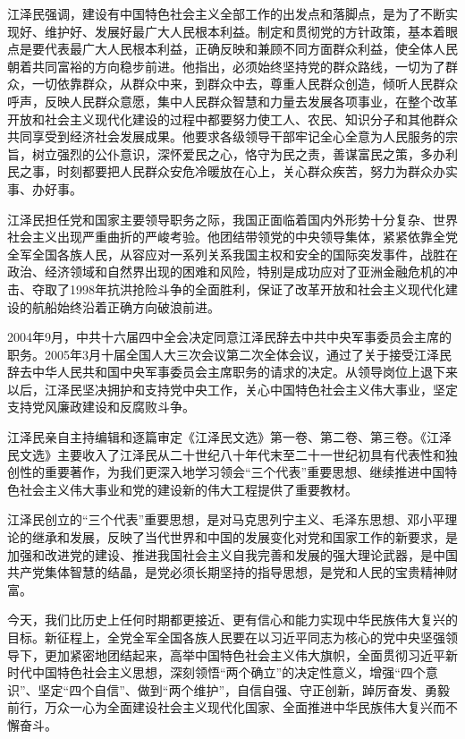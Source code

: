 \documentclass[UTF8, 11pt, oneside]{ctexart}
\begin{document}
江泽民强调，建设有中国特色社会主义全部工作的出发点和落脚点，是为了不断实现好、维护好、发展好最广大人民根本利益。制定和贯彻党的方针政策，基本着眼点是要代表最广大人民根本利益，正确反映和兼顾不同方面群众利益，使全体人民朝着共同富裕的方向稳步前进。他指出，必须始终坚持党的群众路线，一切为了群众，一切依靠群众，从群众中来，到群众中去，尊重人民群众创造，倾听人民群众呼声，反映人民群众意愿，集中人民群众智慧和力量去发展各项事业，在整个改革开放和社会主义现代化建设的过程中都要努力使工人、农民、知识分子和其他群众共同享受到经济社会发展成果。他要求各级领导干部牢记全心全意为人民服务的宗旨，树立强烈的公仆意识，深怀爱民之心，恪守为民之责，善谋富民之策，多办利民之事，时刻都要把人民群众安危冷暖放在心上，关心群众疾苦，努力为群众办实事、办好事。

江泽民担任党和国家主要领导职务之际，我国正面临着国内外形势十分复杂、世界社会主义出现严重曲折的严峻考验。他团结带领党的中央领导集体，紧紧依靠全党全军全国各族人民，从容应对一系列关系我国主权和安全的国际突发事件，战胜在政治、经济领域和自然界出现的困难和风险，特别是成功应对了亚洲金融危机的冲击、夺取了1998年抗洪抢险斗争的全面胜利，保证了改革开放和社会主义现代化建设的航船始终沿着正确方向破浪前进。

2004年9月，中共十六届四中全会决定同意江泽民辞去中共中央军事委员会主席的职务。2005年3月十届全国人大三次会议第二次全体会议，通过了关于接受江泽民辞去中华人民共和国中央军事委员会主席职务的请求的决定。从领导岗位上退下来以后，江泽民坚决拥护和支持党中央工作，关心中国特色社会主义伟大事业，坚定支持党风廉政建设和反腐败斗争。

江泽民亲自主持编辑和逐篇审定《江泽民文选》第一卷、第二卷、第三卷。《江泽民文选》主要收入了江泽民从二十世纪八十年代末至二十一世纪初具有代表性和独创性的重要著作，为我们更深入地学习领会“三个代表”重要思想、继续推进中国特色社会主义伟大事业和党的建设新的伟大工程提供了重要教材。

江泽民创立的“三个代表”重要思想，是对马克思列宁主义、毛泽东思想、邓小平理论的继承和发展，反映了当代世界和中国的发展变化对党和国家工作的新要求，是加强和改进党的建设、推进我国社会主义自我完善和发展的强大理论武器，是中国共产党集体智慧的结晶，是党必须长期坚持的指导思想，是党和人民的宝贵精神财富。

今天，我们比历史上任何时期都更接近、更有信心和能力实现中华民族伟大复兴的目标。新征程上，全党全军全国各族人民要在以习近平同志为核心的党中央坚强领导下，更加紧密地团结起来，高举中国特色社会主义伟大旗帜，全面贯彻习近平新时代中国特色社会主义思想，深刻领悟“两个确立”的决定性意义，增强“四个意识”、坚定“四个自信”、做到“两个维护”，自信自强、守正创新，踔厉奋发、勇毅前行，万众一心为全面建设社会主义现代化国家、全面推进中华民族伟大复兴而不懈奋斗。
\end{document}
